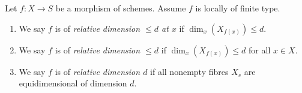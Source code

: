 \begin{definition}
\label{definition-relative-dimension-d}
Let $f : X \to S$ be a morphism of schemes.
Assume $f$ is locally of finite type.
\begin{enumerate}
\item We say $f$ is of {\it relative dimension $\leq d$ at $x$} if
$\dim_x(X_{f(x)}) \leq d$.
\item We say $f$ is of {\it relative dimension $\leq d$} if
$\dim_x(X_{f(x)}) \leq d$ for all $x \in X$.
\item We say $f$ is of {\it relative dimension $d$} if
all nonempty fibres $X_s$ are equidimensional of dimension $d$.
\end{enumerate}
\end{definition}
